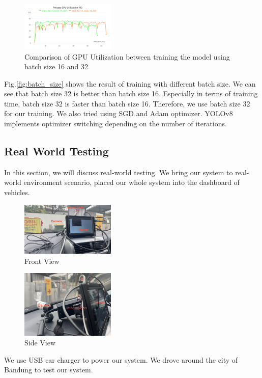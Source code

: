 \documentclass[conference]{IEEEtran}
\begin{document}
\begin{figure}[h!]
\centering
\includegraphics[width=0.4\textwidth,keepaspectratio]{gpu_utilization_comparison.png} 
\caption{Comparison of GPU Utilization between training the model using batch size 16 and 32}
\label{fig:gpu_utilization}
\end{figure}
Fig.\ref{fig:batch_size} shows the result of training with different batch size. We can see that batch size 32 is better than batch size 16. Especially in terms of training time, batch size 32 is faster than batch size 16.
Therefore, we use batch size 32 for our training. We also tried using SGD and Adam optimizer. YOLOv8 implements optimizer switching depending on the number of iterations.


\subsection{Real World Testing}
In this section, we will discuss real-world testing. We bring our system to real-world environment scenario, placed our whole system into the dashboard of vehicles.
\begin{figure}[h!]
    \centering
    \includegraphics[width=0.4\textwidth,keepaspectratio]{mounted_camera_front_view.jpg}
    \caption{Front View}
    \label{fig:front_view}
\end{figure}

\begin{figure}[h!]
    \centering
    \includegraphics[width=0.4\textwidth,keepaspectratio]{mounted_camera_side_view.jpg}
    \caption{Side View}
    \label{fig:side_view}
\end{figure}
We use USB car charger to power our system. We drove around the city of Bandung to test our system. 
\end{document}
